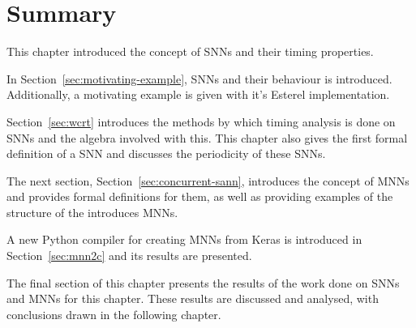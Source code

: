 \section{Summary}
This chapter introduced the concept of \acfp{SNN} and their timing properties.

In Section~\ref{sec:motivating-example}, \acp{SNN} and their behaviour is introduced. 
Additionally, a motivating example is given with it's Esterel implementation.

Section~\ref{sec:wcrt} introduces the methods by which timing analysis is done on \acp{SNN} and the algebra involved with this.
This chapter also gives the first formal definition of a \ac{SNN} and discusses the periodicity of these \acp{SNN}.

The next section, Section~\ref{sec:concurrent-sann}, introduces the concept of \acfp{MNN} and provides formal definitions for them, as well as providing examples of the structure of the introduces \acp{MNN}.

A new Python compiler for creating \acp{MNN} from Keras is introduced in Section~\ref{sec:mnn2c} and its results are presented.

The final section of this chapter presents the results of the work done on \acp{SNN} and \acp{MNN} for this chapter.
These results are discussed and analysed, with conclusions drawn in the following chapter.
